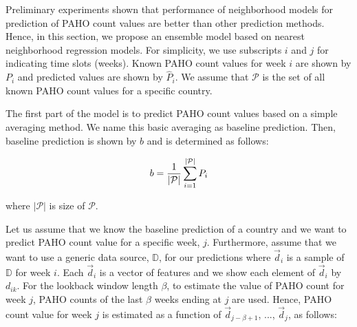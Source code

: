 

Preliminary experiments shown that performance of neighborhood models for prediction of PAHO count values are better than other prediction methods. Hence, in this section, we propose an ensemble model based on nearest neighborhood regression models. For simplicity, we use subscripts $i$ and $j$ for indicating time slots (weeks). Known PAHO count values for week $i$ are shown by $P_{i}$ and predicted values are shown by $\hat{P}_{i}$. We assume that $\mathcal{P}$ is the set of all known PAHO count values for a specific country.

The first part of the model is to predict PAHO count values based on a simple averaging method. We name this basic averaging as baseline prediction. Then, baseline prediction is shown by $b$ and is determined as follows:

\begin{equation}
b = {1 \over {|\mathcal{P}|}} \sum_{i=1}^{|\mathcal{P}|}P_{i}
\end{equation}

where $|\mathcal{P}|$ is size of $\mathcal{P}$. 

Let us assume that we know the baseline prediction of a country and we want to predict PAHO count value for a specific week, $j$. Furthermore, assume that we want to use a generic data source, $\mathbb{D}$, for our predictions where $\vec{d}_i$ is a sample of $\mathbb{D}$ for week $i$. Each $\vec{d}_i$ is a vector of features and we show each element of $\vec{d}_i$ by $d_{ik}$. For the lookback window length $\beta$, to estimate the value of PAHO count for week $j$, PAHO counts of the last $\beta$ weeks ending at $j$ are used. Hence, PAHO count value for week $j$ is estimated as a function of $\vec{d}_{j-\beta+1}$, ..., $\vec{d}_{j}$, as follows:

